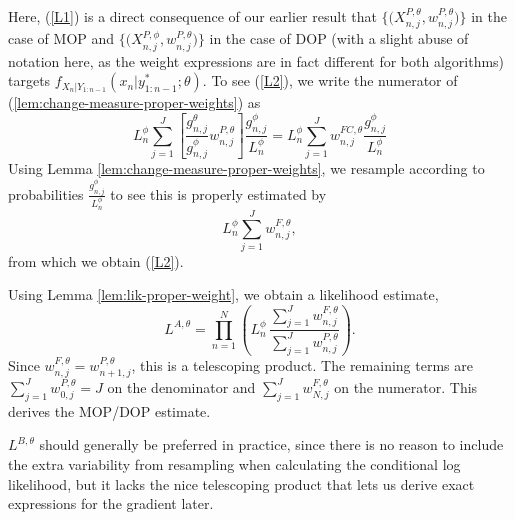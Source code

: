 Here, (\ref{L1}) is a direct consequence of our earlier result that $\{ \big(X^{P,\theta}_{n,j},w^{P,\theta}_{n,j}\big) \}$ in the case of MOP and $\{ \big(X^{P,\phi}_{n,j},w^{P,\theta}_{n,j}\big) \}$ in the case of DOP (with a slight abuse of notation here, as the weight expressions are in fact different for both algorithms) targets $f_{X_{n}|Y_{1:n-1}}(x_{n}|y^*_{1:n-1};\theta)$.
To see  (\ref{L2}),
we write the numerator of (\ref{lem:change-measure-proper-weights}) as
\[
L^\phi_n \sum_{j=1}^J \left[ \frac{g^\theta_{n,j}}{g^\phi_{n,j}} w^{P,\theta}_{n,j}\right] \frac{g^\phi_{n,j}}{L_n^\phi}
= L^\phi_n \sum_{j=1}^J w_{n,j}^{FC,\theta} \frac{g^\phi_{n,j}}{L_n^\phi}
\]
Using Lemma \ref{lem:change-measure-proper-weights}, we resample according to probabilities $\frac{g^\phi_{n,j}}{L_n^\phi}$ to see this is properly estimated by
\[
L^\phi_n \sum_{j=1}^J w^{F,\theta}_{n,j},
\]
from which we obtain (\ref{L2}).

Using Lemma \ref{lem:lik-proper-weight}, we obtain a likelihood estimate,
\[
L^{A,\theta} = \prod_{n=1}^N \left( L^\phi_n \, \frac{\sum_{j=1}^J w^{F,\theta}_{n,j}}{\sum_{j=1}^J w^{P,\theta}_{n,j}}\right).
\]
Since $w^{F,\theta}_{n,j}=w^{P,\theta}_{n+1,j}$, this is a telescoping product. The remaining terms are
$\sum_{j=1}^J w^{P,\theta}_{0,j} = J$ on the denominator and $\sum_{j=1}^J w^{F,\theta}_{N,j}$ on the numerator.
This derives the MOP/DOP estimate.


$L^{B,\theta}$ should generally be preferred in practice, since there is no reason to include the extra variability from resampling when calculating the conditional log likelihood, but it lacks the nice telescoping product that lets us derive exact expressions for the gradient later.